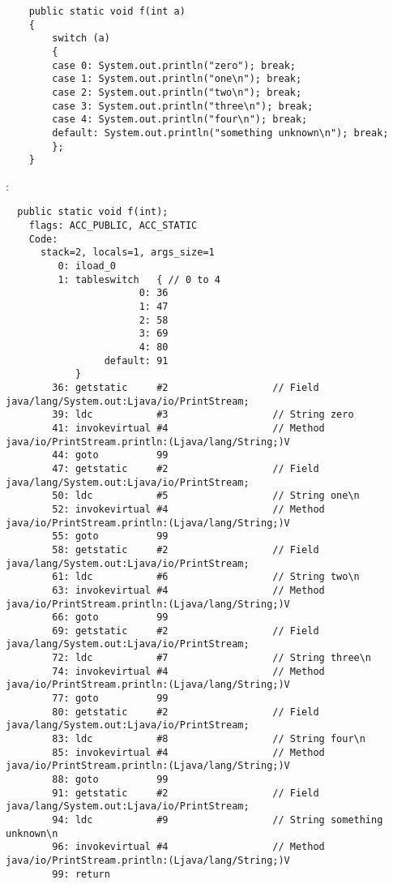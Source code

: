 

\begin{lstlisting}
	public static void f(int a)
	{
		switch (a)
		{
		case 0: System.out.println("zero"); break;
		case 1: System.out.println("one\n"); break;
		case 2: System.out.println("two\n"); break;
		case 3: System.out.println("three\n"); break;
		case 4: System.out.println("four\n"); break;
		default: System.out.println("something unknown\n"); break;
		};
	}
\end{lstlisting}

:

\begin{lstlisting}
  public static void f(int);
    flags: ACC_PUBLIC, ACC_STATIC
    Code:
      stack=2, locals=1, args_size=1
         0: iload_0       
         1: tableswitch   { // 0 to 4
                       0: 36
                       1: 47
                       2: 58
                       3: 69
                       4: 80
                 default: 91
            }
        36: getstatic     #2                  // Field java/lang/System.out:Ljava/io/PrintStream;
        39: ldc           #3                  // String zero
        41: invokevirtual #4                  // Method java/io/PrintStream.println:(Ljava/lang/String;)V
        44: goto          99
        47: getstatic     #2                  // Field java/lang/System.out:Ljava/io/PrintStream;
        50: ldc           #5                  // String one\n
        52: invokevirtual #4                  // Method java/io/PrintStream.println:(Ljava/lang/String;)V
        55: goto          99
        58: getstatic     #2                  // Field java/lang/System.out:Ljava/io/PrintStream;
        61: ldc           #6                  // String two\n
        63: invokevirtual #4                  // Method java/io/PrintStream.println:(Ljava/lang/String;)V
        66: goto          99
        69: getstatic     #2                  // Field java/lang/System.out:Ljava/io/PrintStream;
        72: ldc           #7                  // String three\n
        74: invokevirtual #4                  // Method java/io/PrintStream.println:(Ljava/lang/String;)V
        77: goto          99
        80: getstatic     #2                  // Field java/lang/System.out:Ljava/io/PrintStream;
        83: ldc           #8                  // String four\n
        85: invokevirtual #4                  // Method java/io/PrintStream.println:(Ljava/lang/String;)V
        88: goto          99
        91: getstatic     #2                  // Field java/lang/System.out:Ljava/io/PrintStream;
        94: ldc           #9                  // String something unknown\n
        96: invokevirtual #4                  // Method java/io/PrintStream.println:(Ljava/lang/String;)V
        99: return        
\end{lstlisting}
